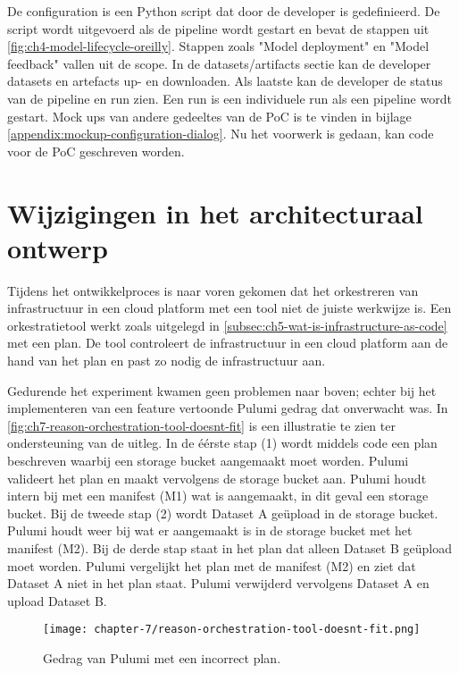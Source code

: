 De configuration is een Python script dat door de developer is gedefinieerd. De script wordt uitgevoerd als de pipeline wordt gestart en bevat de stappen uit \autoref{fig:ch4-model-lifecycle-oreilly}. Stappen zoals \string"Model deployment\string" en \string"Model feedback\string" vallen uit de scope. In de datasets/\glspl{artifact} sectie kan de developer datasets en artefacts up- en downloaden. Als laatste kan de developer de status van de pipeline en run zien. Een run is een individuele run als een pipeline wordt gestart. Mock ups van andere gedeeltes van de PoC is te vinden in bijlage \ref{appendix:mockup-configuration-dialog}. Nu het voorwerk is gedaan, kan code voor de PoC geschreven worden.

\section{Wijzigingen in het architecturaal ontwerp}\label{sec:ch7-wijzigingen-in-het-architecturaal-ontwerp}
Tijdens het ontwikkelproces is naar voren gekomen dat het orkestreren van infrastructuur in een cloud platform met een tool niet de juiste werkwijze is. Een orkestratietool werkt zoals uitgelegd in \autoref{subsec:ch5-wat-is-infrastructure-as-code} met een plan. De tool controleert de infrastructuur in een cloud platform aan de hand van het plan en past zo nodig de infrastructuur aan.

Gedurende het experiment kwamen geen problemen naar boven; echter bij het implementeren van een feature vertoonde Pulumi gedrag dat onverwacht was. In \autoref{fig:ch7-reason-orchestration-tool-doesnt-fit} is een illustratie te zien ter ondersteuning van de uitleg. In de éérste stap (1) wordt middels code een plan beschreven waarbij een storage bucket aangemaakt moet worden. Pulumi valideert het plan en maakt vervolgens de storage bucket aan. Pulumi houdt intern bij met een manifest (M1) wat is aangemaakt, in dit geval een storage bucket. Bij de tweede stap (2) wordt Dataset A geüpload in de storage bucket. Pulumi houdt weer bij wat er aangemaakt is in de storage bucket met het manifest (M2). Bij de derde stap staat in het plan dat alleen Dataset B geüpload moet worden. Pulumi vergelijkt het plan met de manifest (M2) en ziet dat Dataset A niet in het plan staat. Pulumi verwijderd vervolgens Dataset A en upload Dataset B.

\begin{figure}[hbt!]
  \centering
  \texttt{[image: chapter-7/reason-orchestration-tool-doesnt-fit.png]}
  \caption{Gedrag van Pulumi met een incorrect plan.}
  \label{fig:ch7-reason-orchestration-tool-doesnt-fit}
\end{figure}

